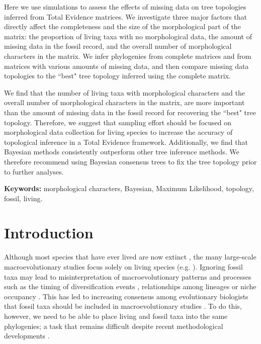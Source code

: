 \documentclass[12pt,letterpaper]{article}
\begin{document}
Here we use simulations to assess the effects of missing data on tree topologies inferred from Total Evidence matrices.
We investigate three major factors that directly affect the completeness and the size of the morphological part of the matrix: the proportion of living taxa with no morphological data, the amount of missing data in the fossil record, and the overall number of morphological characters in the matrix.
We infer phylogenies from complete matrices and from matrices with various amounts of missing data, and then compare missing data topologies to the ``best" tree topology inferred using the complete matrix.

We find that the number of living taxa with morphological characters and the overall number of morphological characters in the matrix, are more important than the amount of missing data in the fossil record for recovering the ``best" tree topology.
Therefore, we suggest that sampling effort should be focused on morphological data collection for living species to increase the accuracy of topological inference in a Total Evidence framework.
Additionally, we find that Bayesian methods consistently outperform other tree inference methods.
We therefore recommend using Bayesian consensus trees to fix the tree topology prior to further analyses.

\bigskip
\noindent
\textbf{Keywords:} morphological characters, Bayesian, Maximum Likelihood, topology, fossil, living.

%
%

\newpage
\section{Introduction}
Although most species that have ever lived are now extinct \citep{novacek1992ext,raup1993extinction}, the many large-scale macroevolutionary studies focus solely on living species (e.g. \citealp{meredithimpacts2011,jetzthe2012}).
Ignoring fossil taxa may lead to misinterpretation of macroevolutionary patterns and processes such as the timing of diversification events \citep[e.g.][]{pyrondivergence2011}, relationships among lineages \citep[e.g.][]{manosphylogeny2007} or niche occupancy \citep[e.g.][]{pearmanniche2008}.
This has led to increasing consensus among evolutionary biologists that fossil taxa should be included in macroevolutionary studies \citep{jacksonwhat2006,quentaldiversity2010,dietlconservation2011,slaterunifying2013,fritzdiversity2013}.
To do this, however, we need to be able to place living and fossil taxa into the same phylogenies; a task that remains difficult despite recent methodological developments \citep[e.g.][]{pyrondivergence2011,ronquista2012,BEASTmaster}.
\end{document}
